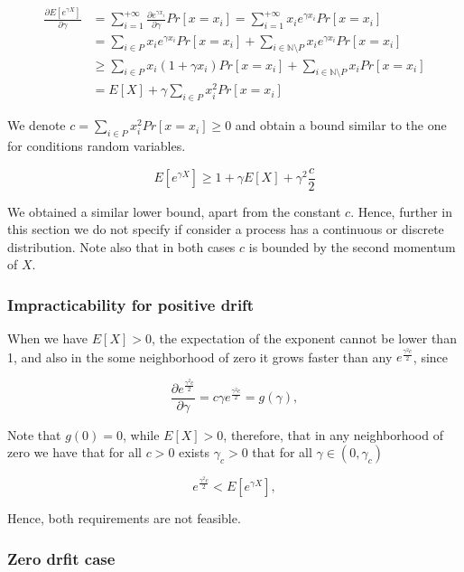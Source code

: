 \documentclass[12pt, a4paper]{article}
\theoremstyle{remark}
\newcommand{\der}[2]{\frac{\partial #1}{\partial #2}}
\begin{document}
\begin{align*}
    \der{E[e^{\gamma X}]}{\gamma} & = \sum_{i = 1}^{+\infty} \frac{\partial e^{\gamma x_i}}{\partial \gamma} Pr[x = x_i] = \sum_{i = 1}^{+\infty} x_i e^{\gamma x_i} Pr[x = x_i] \\
                                  & = \sum_{i \in P} x_i e^{\gamma x_i} Pr[x = x_i] + \sum_{i \in \mathbb{N}\setminus P} x_i e^{\gamma x_i} Pr[x = x_i]                          \\
                                  & \geq \sum_{i \in P} x_i (1 + {\gamma x_i}) Pr[x = x_i] + \sum_{i \in \mathbb{N}\setminus P} x_i Pr[x = x_i]                                  \\
                                  & = E[X] + \gamma\sum_{i \in P} x_i^2 Pr[x = x_i]
\end{align*}

We denote $c = \sum_{i \in P} x_i^2 Pr[x = x_i] \geq 0$ and obtain a bound similar to the one for conditions random variables.

\[
    E[e^{\gamma X}] \geq 1 + \gamma E[X] + \gamma^2 \frac{c}{2}
\]


We obtained a similar lower bound, apart from the constant \(c\). Hence,
further in this section we do not specify if consider a process has a continuous or discrete distribution. Note also that in both cases \(c\) is bounded by the second momentum of \(X\).

\subsubsection{Impracticability for positive drift}

When we have \(E\left[X\right] > 0\), the expectation of the exponent cannot be lower than 1, and also in the some neighborhood of zero it grows faster than any $e^{\frac{\gamma^2 c}{2}}$, since

$$\frac{\partial e^{\frac{\gamma^2 c}{2}}}{\partial \gamma} = c\gamma e^{\frac{\gamma^2 c}{2}} = g(\gamma),$$

Note that $g(0) = 0$, while $E[X] > 0$, therefore, that in any neighborhood of zero we have that for all \(c>0\) exists \(\gamma_c > 0\)  that for all \(\gamma \in (0, \gamma_c)\) 

$$e^{\frac{\gamma^2 c}{2}} < E[e^{\gamma X}],$$


Hence, both requirements are not feasible.

\subsubsection{Zero drfit case}
\label{sec:zero}
\end{document}
